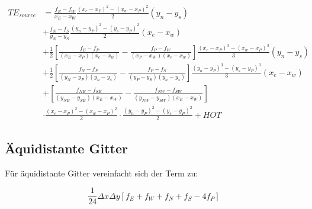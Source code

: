 \documentclass[11pt, ngerman,colorback,accentcolor=tud2d]{tudreport}
\begin{document}
\begin{align*}
  TE_{source} &= \frac{f_E-f_W}{x_E-x_W} \frac{(x_e-x_P)^2 - (x_w-x_P)^2}{2} (y_n-y_s)\\
              &+ \frac{f_N-f_S}{y_N-y_S}  \frac{(y_n-y_P)^2-(y_s-y_P)^2}{2} (x_e-x_w) \\
              &+ \frac{1}{2}
  \left[{\frac{f_E-f_P}{(x_E-x_P)(x_e-x_w)}-\frac{f_P-f_W}{(x_P-x_W)(x_e-x_w)}  }\right]
  \frac{(x_e-x_P)^3 - (x_w-x_P)^3}{3} (y_n-y_s)\\
  &+ \frac{1}{2}
  \left[{\frac{f_N-f_P}{(y_N-y_P)(y_n-y_s)}-\frac{f_P-f_S}{(y_P-y_S)(y_n-y_s)}  }\right]
  \frac{(y_n-y_P)^3-(y_s-y_P)^3}{3} (x_e-x_w) \\
  &+ \left[{\frac{f_{NE}-f_{SE}}{(y_{NE}-y_{SE})(x_E-x_W) }- \frac{f_{NW}-f_{SW}}{(y_{NW}-y_{SW})(x_E-x_W)} }\right]\\
  &\cdot \frac{(x_e-x_P)^2 - (x_w-x_P)^2}{2} \cdot \frac{(y_n-y_P)^2-(y_s-y_P)^2}{2} + HOT
\end{align*}

\subsection{Äquidistante Gitter}

Für äquidistante Gitter vereinfacht sich der Term zu:

\begin{equation}
  \frac{1}{24} \Delta x \Delta y \left[{f_E+f_W+f_N+f_S - 4f_P}\right]
\end{equation}
\end{document}
